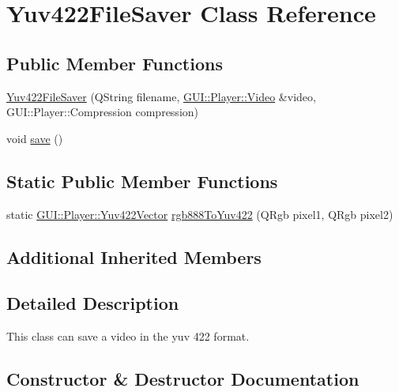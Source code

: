 \hypertarget{classGUI_1_1Player_1_1Yuv422FileSaver}{}\section{Yuv422\+File\+Saver Class Reference}
\label{classGUI_1_1Player_1_1Yuv422FileSaver}
\subsection*{Public Member Functions}
\begin{DoxyCompactItemize}
\item 
\hyperlink{classGUI_1_1Player_1_1Yuv422FileSaver_a94bb9821e774b6b7dbed48173d459fd7}{Yuv422\+File\+Saver} (Q\+String filename, \hyperlink{classGUI_1_1Player_1_1Video}{G\+U\+I\+::\+Player\+::\+Video} \&video, G\+U\+I\+::\+Player\+::\+Compression compression)
\item 
void \hyperlink{classGUI_1_1Player_1_1Yuv422FileSaver_aae2c382151ef7c9aa913361172b30db6}{save} ()
\end{DoxyCompactItemize}
\subsection*{Static Public Member Functions}
\begin{DoxyCompactItemize}
\item 
static \hyperlink{classGUI_1_1Player_1_1Yuv422Vector}{G\+U\+I\+::\+Player\+::\+Yuv422\+Vector} \hyperlink{classGUI_1_1Player_1_1Yuv422FileSaver_af604a02ccb4a5c1830b9011e06a07e3c}{rgb888\+To\+Yuv422} (Q\+Rgb pixel1, Q\+Rgb pixel2)
\end{DoxyCompactItemize}
\subsection*{Additional Inherited Members}


\subsection{Detailed Description}
This class can save a video in the yuv 422 format. 

\subsection{Constructor \& Destructor Documentation}
\hypertarget{classGUI_1_1Player_1_1Yuv422FileSaver_a94bb9821e774b6b7dbed48173d459fd7}{}
